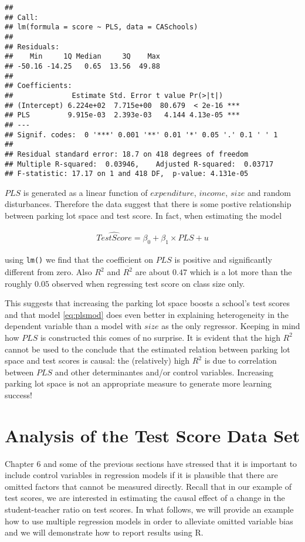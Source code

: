 \documentclass[]{book}
\theoremstyle{definition}
\theoremstyle{definition}
\theoremstyle{definition}
\theoremstyle{remark}
\begin{document}
\begin{verbatim}
## 
## Call:
## lm(formula = score ~ PLS, data = CASchools)
## 
## Residuals:
##    Min     1Q Median     3Q    Max 
## -50.16 -14.25   0.65  13.56  49.88 
## 
## Coefficients:
##              Estimate Std. Error t value Pr(>|t|)    
## (Intercept) 6.224e+02  7.715e+00  80.679  < 2e-16 ***
## PLS         9.915e-03  2.393e-03   4.144 4.13e-05 ***
## ---
## Signif. codes:  0 '***' 0.001 '**' 0.01 '*' 0.05 '.' 0.1 ' ' 1
## 
## Residual standard error: 18.7 on 418 degrees of freedom
## Multiple R-squared:  0.03946,    Adjusted R-squared:  0.03717 
## F-statistic: 17.17 on 1 and 418 DF,  p-value: 4.131e-05
\end{verbatim}

\(PLS\) is generated as a linear function of \(expenditure\),
\(income\), \(size\) and random disturbances. Therefore the data suggest
that there is some postive relationship between parking lot space and
test score. In fact, when estimating the model

\begin{align}
\widehat{TestScore} = \beta_0 + \beta_1 \times PLS + u \label{eq:plsmod} 
\end{align}

using \texttt{lm()} we find that the coefficient on \(PLS\) is positive
and significantly different from zero. Also \(R^2\) and
\(\overline{R^2}\) are about \(0.47\) which is a lot more than the
roughly \(0.05\) observed when regressing test score on class size only.

This suggests that increasing the parking lot space boosts a school's
test scores and that model \eqref{eq:plsmod} does even better in
explaining heterogeneity in the dependent variable than a model with
\(size\) as the only regressor. Keeping in mind how \(PLS\) is
constructed this comes of no surprise. It is evident that the high
\(R^2\) cannot be used to the conclude that the estimated relation
between parking lot space and test scores is causal: the (relatively)
high \(R^2\) is due to correlation between \(PLS\) and other
determinantes and/or control variables. Increasing parking lot space is
not an appropriate measure to generate more learning success!

\section{Analysis of the Test Score Data
Set}\label{analysis-of-the-test-score-data-set}

Chapter 6 and some of the previous sections have stressed that it is
important to include control variables in regression models if it is
plausible that there are omitted factors that cannot be measured
directly. Recall that in our example of test scores, we are interested
in estimating the causal effect of a change in the student-teacher ratio
on test scores. In what follows, we will provide an example how to use
multiple regression models in order to alleviate omitted variable bias
and we will demonstrate how to report results using R.
\end{document}
